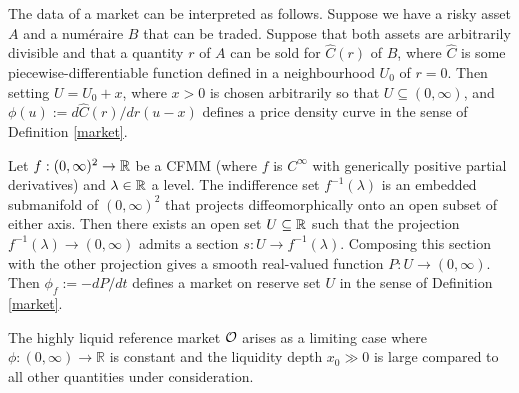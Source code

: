 The data of a market can be interpreted as follows.
%
Suppose we have a risky asset \(A\) and a num\'eraire \(B\) that can be traded. 
%
Suppose that both assets are arbitrarily divisible and that a quantity \(r\) of \(A\) can be sold for \(\hat{C}(r)\) of \(B\), where \(\hat{C}\) is some piecewise-differentiable function defined in a neighbourhood \(U_0\) of \(r=0\). 
%
Then setting \(U=U_0+x\), where \(x>0\) is chosen arbitrarily so that \(U\subseteq(0,\infty)\), and \(\phi(u):=d\hat{C}(r)/dr(u-x)\) defines a price density curve in the sense of Definition \ref{market}. 

\begin{example}[CFMM]

  Let \(f:(0,\infty)^2\rightarrow\mathbb R\) be a CFMM (where $f$ is \(C^\infty\) with generically positive partial derivatives) and \(\lambda\in\mathbb R\) a level. 
  The indifference set \(f^{-1}(\lambda)\) is an embedded submanifold of \((0,\infty)^2\) that projects diffeomorphically onto an open subset of either axis. 
  Then there exists an open set \(U\subseteq\mathbb R\) such that the projection \(f^{-1}(\lambda)\rightarrow (0,\infty)\) admits a section \(s:U\rightarrow f^{-1}(\lambda)\). 
  Composing this section with the other projection gives a smooth real-valued function \(P:U\rightarrow (0,\infty)\). 
  Then \(\phi_f:=-dP/dt\) defines a market on reserve set \(U\) in the sense of Definition \ref{market}.

\end{example}

\begin{comment}
\begin{example}[Limit order book]

  Given a snapshot of a limit order book with a set \((r_i,\ell_i)_{i\in I}\) of limit orders (with size \(r>0\) denominated in the numeraire and limit \(\ell>0\)), we can recover a demand function by the formula 
  \[
    \phi(u) \defeq \sum_{i\in I,\ell_i\leq u}r_i
  \]
  While this provides a realistic model for the execution of a single trade, it is not realistic for the execution of multiple trades in a row, because in a limit order book executing trades always changes the liquidity curve.

\end{example}
\end{comment}

\begin{example} 
  
  The highly liquid reference market \(\mathcal{O}\) arises as a limiting case where \(\phi:(0,\infty)\rightarrow\mathbb{R}\) is constant and the liquidity depth $x_0 \gg 0$ is large compared to all other quantities under consideration.

\end{example}

